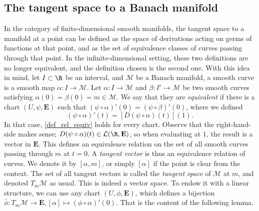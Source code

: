 \subsection{The tangent space to a Banach manifold} \label{section_tangent_space_Banach}
In the category of finite-dimensional smooth manifolds, the tangent space to a manifold at a point can be defined as the space of derivations acting on germs of functions at that point, and as the set of equivalence classes of curves passing through that point. In the infinite-dimensional setting, these two definitions are no longer equivalent, and the definition chosen is the second one. With this idea in mind, let \(I \subset \R\) be an interval, and \(\mathcal{M}\) be a Banach manifold, a smooth curve is a smooth map \(\alpha \colon I \to \mathcal{M}\). Let \(\alpha\colon I \to \mathcal{M}\) and \(\beta \colon I' \to \mathcal{M}\) be two smooth curves satisfying \(\alpha(0)=\beta(0)=m \in \mathcal{M}\). We say that they are \textit{equivalent} if there is a chart \((U, \psi, \mathbf{E})\) such that \((\psi \circ \alpha)'(0)=(\psi \circ \beta)'(0)\), where we defined
\begin{equation} \label{def_rel_equiv}
(\psi \circ \alpha)'(t)=[D(\psi \circ \alpha)(t)](1).
\end{equation}
In that case, \eqref{def_rel_equiv} holds for every chart. Observe that the right-hand-side makes sense; \(D(\psi \circ \alpha)(t) \in \mathcal{L}(\R, \mathbf{E})\), so when evaluating at \(1\), the result is a vector in \(\mathbf{E}\). This defines an equivalence relation on the set of all smooth curves passing through \(m\) at $t=0$. A \textit{tangent vector} is thus an equivalence relation of curves. We denote it by \([\alpha, m]\), or simply \([\alpha]\) if the point is clear from the context. The set of all tangent vectors is called the \textit{tangent space} of \(\mathcal{M}\) at \(m\), and denoted \(T_m\mathcal{M}\) as usual. This is indeed a vector space. To endow it with a linear structure, we can use any chart \((U, \phi, \mathbf{E})\), which defines a bijection \(\bar \phi\colon  T_m\mathcal{M} \to \mathbf{E}, [\alpha] \mapsto (\phi \circ \alpha)'(0)\). That is the content of the following lemma.

